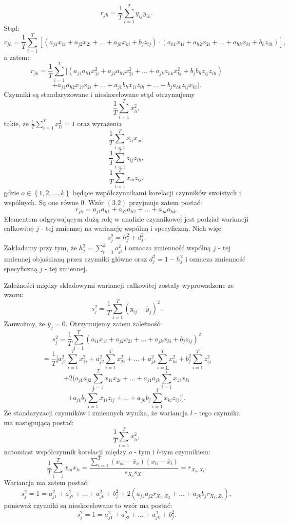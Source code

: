 \documentclass[12pt,a4paper]{report}
\newcommand{\set}[1]{\left\lbrace {#1} \right\rbrace}
\begin{document}
\begin{equation}
r_{jh}=\frac{1}{T} \sum_{i=1}^{T} y_{ij} y_{ih}.
\end{equation}
Stąd:
$$
r_{jh}=\frac{1}{T} \sum_{i=1}^{T} [(a_{j1}x_{1i} + a_{j2}x_{2i} + \ldots + a_{jk}x_{ki} + b_jz_{ij}) 
\cdot(a_{h1}x_{1i} + a_{h2}x_{2i} + \ldots + a_{hk}x_{ki} + b_hz_{ih})],
$$
a zatem:
$$
r_{jh}=\frac{1}{T} \sum_{i=1}^{T} [(a_{j1}a_{h1}x_{1i}^2 + a_{j2}a_{h2}x_{2i}^2 + \ldots + a_{jk} a_{hk} x_{ki}^2 + b_jb_hz_{ij}z_{ih}) 
$$
$$
+ a_{j1}a_{h2}x_{1i}x_{2i} + \ldots + a_{j1}b_h x_{1i}z_{ih} + \ldots + b_j a_{hk} z_{ij}x_{ki}]. 
$$
Czynniki są standaryzowane i nieskorelowane stąd otrzymujemy  
$$
\frac{1}{T} \sum_{i=1}^{T} x_{li}^2,
$$
takie, że $\frac{1}{T} \sum_{i=1}^{T} x_{li}^2 = 1$ oraz wyrażenia
$$
\frac{1}{T} \sum_{i=1}^{T} x_{li} x_{oi}, 
$$
$$
\frac{1}{T} \sum_{i=1}^{T} z_{ij} z_{ih}, 
$$
$$
\frac{1}{T} \sum_{i=1}^{T} x_{oi} z_{ij},
$$
gdzie
$o \in \set{1,2, \ldots ,k}$ będące współczynnikami korelacji czynników swoistych i wspólnych. Są one równe $0$.
Wzór $(3.2)$ przyjmuje zatem postać:
$$
r_{jh} = a_{j1}a_{h1} + a_{j2}a_{h2}+ \ldots + a_{jk}a_{hk}.
$$
Elementem odgrywającym dużą rolę w analizie czynnikowej jest podział wariancji całkowitej $j$ - tej zmiennej na wariancję wspólną i specyficzną. Nich więc:
$$
s_j^2 = h_j^2 + d_j^2.
$$
Zakładamy przy tym, że $ h_j^2 = \sum_{l=1}^k a_{jl}^2$ i oznacza zmienność wspólną $j$ - tej zmiennej objaśnianą przez czynniki główne oraz $d_{j}^2 = 1 - h_j^2$ i oznacza zmienność specyficzną $j$ - tej zmiennej.

Zależności między składowymi wariancji całkowitej zostały wyprowadzone ze wzoru:
$$
s_j^2 = \frac{1}{T} \sum_{i=1}^T (y_{ij} - \overline{y}_j)^2.
$$
Zauważmy, że $\overline{y}_j =0$. Otrzymujemy zatem zależność:
$$
s_j^2 = \frac{1}{T} \sum_{i=1}^T (a_{i1} x_{1i} + a_{j2} x_{2i} + \ldots + a_{jk} x_{ki} + b_j z_{ij})^2
$$
$$
=\frac{1}{T}[a_{j1}^2 \sum_{i=1}^T x_{1i}^2 + a_{j2}^2 \sum_{i=1}^T x_{2i}^2 + \ldots + a_{jk}^2 \sum_{i=1}^T x_{ki}^2 + b_j^2 \sum_{i=1}^T z_{ij}^2
$$
$$
+ 2 (a_{j1} a_{j2} \sum_{i=1}^T x_{1i} x_{2i} + \ldots + a_{j1} a_{jk} \sum_{i=1}^T x_{1i} x_{ki}
$$
$$
+ a_{j1} b_j \sum_{i=1}^T x_{1i} z_{ij} + \ldots + a_{jk} b_j \sum_{i=1}^T x_{ki} z_{ij})].
$$
Ze standaryzacji czynników i zmiennych wynika, że wariancja $l$ - tego czynnika ma następującą postać:
$$
\frac{1}{T} \sum_{i=1}^T x_{li}^2,
$$
natomiast współczynnik korelacji między $o$ - tym i $l$-tym czynnikiem:
$$
\frac{1}{T} \sum_{i=1}^T x_{oi} x_{li} = \frac{\sum_{i=1}^T (x_{oi} - \overline{x}_{o})(x_{li} - \overline{x}_{l})}{s_{X_o} s_{X_1}} = r_{{X_o, X_l}}.
$$
Wariancja ma zatem postać:
$$
s_j^2 = 1 = a_{j1}^2 + a_{j2}^2 + \ldots + a_{jk}^2 + b_j^2 + 2(a_{j1} a_{j2} r_{{X_1, X_2}} + \ldots + a_{jk} b_j r_{X_{k},Z_j}),
$$
ponieważ czynniki są nieskorelowane to wzór ma postać:
$$
s_j^2 = 1 = a_{j1}^2+a_{j2}^2 + \ldots + a_{jk}^2 + b_j^2.
$$
\end{document}
